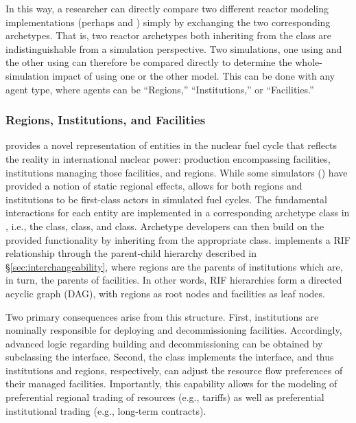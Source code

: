 In this way, a researcher can directly compare two different reactor modeling 
implementations (perhaps  and ) 
simply by exchanging the two corresponding archetypes. That is, two reactor 
archetypes both inheriting from the  class are indistinguishable 
from a simulation perspective. Two simulations, one using 
 and the other using  can therefore 
be compared directly to determine the whole-simulation impact of using one or the other model.
This can be done with any agent type, where agents can be ``Regions,'' 
``Institutions,'' or ``Facilities.''

\subsubsection{Regions, Institutions, and Facilities}

\Cyclus provides a novel representation of entities in the nuclear fuel cycle 
that reflects the reality in international nuclear power: production
encompassing facilities, institutions managing those facilities, and regions. While
some simulators () have provided a notion of static regional
effects, \Cyclus allows for both regions and institutions to be first-class
actors in simulated fuel cycles. The fundamental interactions for each entity are implemented in a corresponding
archetype class in \Cyclus, i.e., the  class, 
class, and  class. Archetype developers can then build on the
provided functionality by inheriting from the appropriate class.
\Cyclus implements a \gls{RIF} relationship through the
parent-child hierarchy described in \S \ref{sec:interchangeability}, where
regions are the parents of institutions which are, in turn, the parents of
facilities. In other words, \gls{RIF} hierarchies form a directed acyclic graph (DAG),
with regions as root nodes and facilities as leaf nodes.

Two primary consequences arise from this structure. First, institutions are
nominally
responsible for deploying and decommissioning facilities. Accordingly, advanced
logic regarding building and decommissioning can be obtained by subclassing the
 interface. Second, the  class implements the
 interface, and thus institutions and regions, respectively, can
adjust the resource flow preferences of their managed facilities. Importantly,
this capability allows for the modeling of preferential regional trading
of resources (e.g., tariffs) as well as preferential institutional trading
(e.g., long-term contracts).


